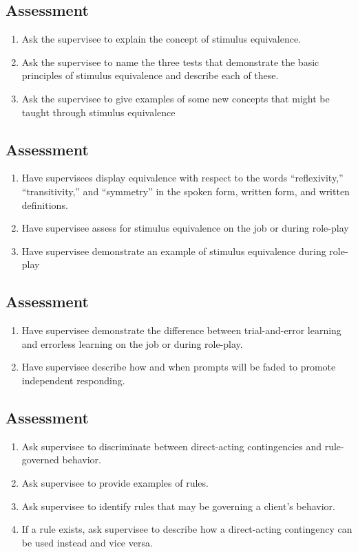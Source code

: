 \subsection{Assessment}
\begin{enumerate}
\item Ask the supervisee to explain the concept of stimulus equivalence.
\item Ask the supervisee to name the three tests that demonstrate the basic principles of stimulus equivalence and describe each of these.
\item Ask the supervisee to give examples of some new concepts that might be taught through stimulus equivalence
\end{enumerate}
%
\subsection{Assessment}
\begin{enumerate}
\item Have supervisees display equivalence with respect to the words ``reflexivity,'' ``transitivity,'' and ``symmetry'' in the spoken form, written form, and written definitions.
\item Have supervisee assess for stimulus equivalence on the job or during role-play 
\item Have supervisee demonstrate an example of stimulus equivalence during role-play
%
\end{enumerate}
%
\subsection{Assessment}
\begin{enumerate}
\item Have supervisee demonstrate the difference between trial-and-error learning and errorless learning on the job or during role-play.
\item Have supervisee describe how and when prompts will be faded to promote independent responding. 
%
\end{enumerate}
%
\subsection{Assessment}
\begin{enumerate}
\item Ask supervisee to discriminate between direct-acting contingencies and rule-governed behavior.
\item Ask supervisee to provide examples of rules.
\item Ask supervisee to identify rules that may be governing a client's behavior.
\item If a rule exists, ask supervisee to describe how a direct-acting contingency can be used instead and vice versa.
\end{enumerate}
%
